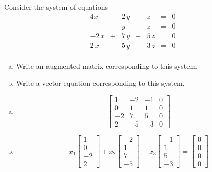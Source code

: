 
\begin{exerciseStatement}


 Consider the system of equations 
\begin{alignat*}{4} x &-& 2 \, y &-& z &=& 0 \\ & & y &+& z &=& 0 \\-2 \, x &+& 7 \, y &+& 5 \, z &=& 0 \\2 \, x &-& 5 \, y &-& 3 \, z &=& 0 \\ \end{alignat*}
            


\begin{enumerate}[(a)]
\item  Write an augmented matrix corresponding to this system. 
\item  Write a vector equation corresponding to this system. 
\end{enumerate}
    
\end{exerciseStatement}
    
\begin{exerciseAnswer} 

\begin{enumerate}[(a)]
\item \[ \left[\begin{array}{ccc|c}
1 & -2 & -1 & 0 \\
0 & 1 & 1 & 0 \\
-2 & 7 & 5 & 0 \\
2 & -5 & -3 & 0
\end{array}\right] \]
\item \[ x_{1} \left[\begin{array}{c}
1 \\
0 \\
-2 \\
2
\end{array}\right] + x_{2} \left[\begin{array}{c}
-2 \\
1 \\
7 \\
-5
\end{array}\right] + x_{3} \left[\begin{array}{c}
-1 \\
1 \\
5 \\
-3
\end{array}\right] = \left[\begin{array}{c}
0 \\
0 \\
0 \\
0
\end{array}\right] \]
\end{enumerate}
    
\end{exerciseAnswer}
    
